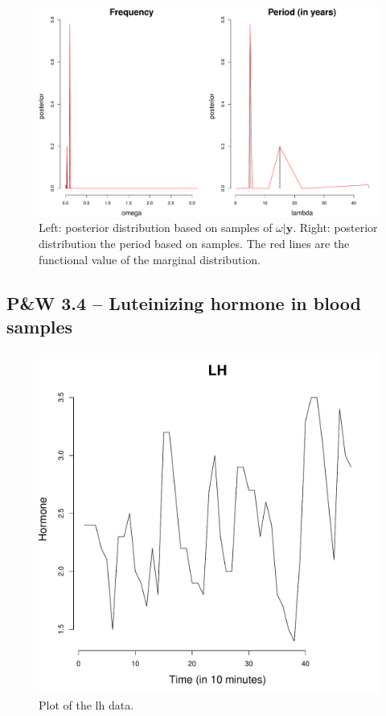 \documentclass[12pt]{article}
\newcommand{\m}[1]{\mathbf{\bm{#1}}}
\begin{document}
\begin{figure}[H]
\begin{center}
\includegraphics[scale=0.34]{sp_soi.pdf}
\end{center}
\caption{Left: posterior distribution based on samples of $\omega|\m{y}$. Right: posterior distribution the period based on samples. The red lines are the functional value of the marginal distribution.}
\end{figure}

\newpage

\subsection*{P\&W 3.4 -- Luteinizing hormone in blood samples}

\begin{figure}[H]
\begin{center}
\includegraphics[scale=0.40]{dat_lh.pdf}
\end{center}
\caption{Plot of the lh data.}
\end{figure}
\end{document}
